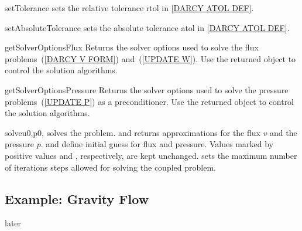 \begin{methoddesc}[DarcyFlow]{setTolerance}{}
sets the relative tolerance \mbox{rtol} in \ref{DARCY ATOL DEF}.
\end{methoddesc}

\begin{methoddesc}[DarcyFlow]{setAbsoluteTolerance}{}
sets the absolute tolerance \mbox{atol} in \ref{DARCY ATOL DEF}.
\end{methoddesc}

\begin{methoddesc}[DarcyFlow]{getSolverOptionsFlux}{}
Returns the solver options used to solve the flux problems~(\ref{DARCY V FORM}) and~(\ref{UPDATE W}). Use the returned \SolverOptions object to control the solution algorithms. 
\end{methoddesc}

\begin{methoddesc}[DarcyFlow]{getSolverOptionsPressure}{}
Returns the solver options used to solve the pressure problems~(\ref{UPDATE P}) as a preconditioner. 
Use the returned \SolverOptions object to control the solution algorithms. 
\end{methoddesc}

\begin{methoddesc}[DarcyFlow]{solve}{u0,p0, }
solves the problem. and returns approximations for the flux $v$ and the pressure $p$. 
 and  define initial guess for flux and pressure. Values marked
by positive values  and , respectively, are kept unchanged.  sets the maximum number of iterations steps allowed for solving the coupled problem.
\end{methoddesc}


\subsection{Example: Gravity Flow}
later